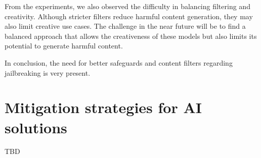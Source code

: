 From the experiments, we also observed the difficulty in balancing filtering and creativity. Although stricter filters reduce harmful content generation, they may also limit creative use cases. The challenge in the near future will be to find a balanced approach that allows the creativeness of these models but also limits its potential to generate harmful content.

In conclusion, the need for better safeguards and content filters regarding jailbreaking is very present.





\section{Mitigation strategies for AI solutions}
TBD




